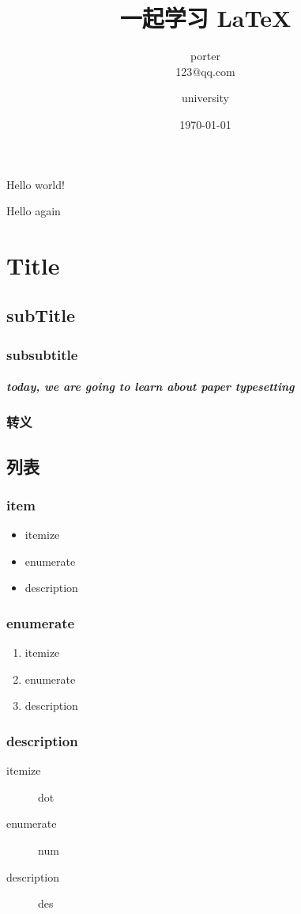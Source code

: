 \documentclass[twocolumn]{ctexart}
\title{一起学习 \LaTeX}
\author{porter \\123@qq.com \and university}
\date{\today}
\begin{document}
    \maketitle
    \tableofcontents
    \clearpage
    Hello world!

    Hello again

    \section{Title}
        \subsection{subTitle}
            \subsubsection{subsubtitle}
                \subparagraph{today, we are going to learn about paper typesetting}

            \subsubsection{转义}

        \subsection{列表}
            \subsubsection{item}
                \begin{itemize}
                    \item itemize
                    \item enumerate
                    \item description
                \end{itemize}
            \subsubsection{enumerate}
                \begin{enumerate}
                    \item itemize
                    \item enumerate
                    \item description
                \end{enumerate}
            \subsubsection{description}
                \begin{description}
                    \item[itemize] dot
                    \item[enumerate] num
                    \item[description] des
                \end{description}
\end{document}
